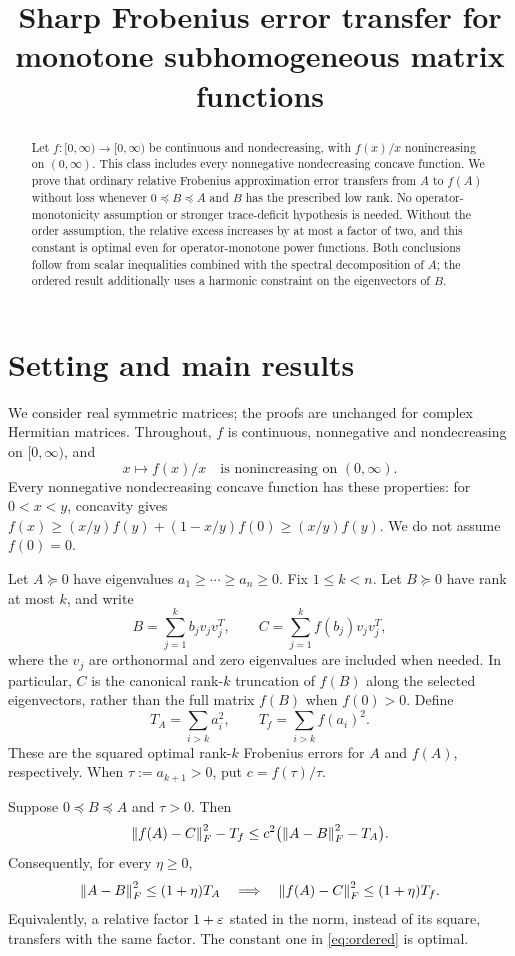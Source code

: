 \documentclass[11pt]{article}
\title{Sharp Frobenius error transfer for monotone subhomogeneous matrix functions}
\author{}
\date{}
\newcommand{\TA}{T_A}
\newcommand{\Tf}{T_f}
\begin{document}
\maketitle
\begin{abstract}
Let $f:[0,\infty)\to[0,\infty)$ be continuous and nondecreasing, with $f(x)/x$ nonincreasing on $(0,\infty)$. This class includes every nonnegative nondecreasing concave function. We prove that ordinary relative Frobenius approximation error transfers from $A$ to $f(A)$ without loss whenever $0\preceq B\preceq A$ and $B$ has the prescribed low rank. No operator-monotonicity assumption or stronger trace-deficit hypothesis is needed. Without the order assumption, the relative excess increases by at most a factor of two, and this constant is optimal even for operator-monotone power functions. Both conclusions follow from scalar inequalities combined with the spectral decomposition of $A$; the ordered result additionally uses a harmonic constraint on the eigenvectors of $B$.
\end{abstract}

\section{Setting and main results}
We consider real symmetric matrices; the proofs are unchanged for complex Hermitian matrices. Throughout, $f$ is continuous, nonnegative and nondecreasing on $[0,\infty)$, and
\begin{equation}\label{eq:subhom}
 x\longmapsto f(x)/x\quad\text{is nonincreasing on }(0,\infty).
\end{equation}
Every nonnegative nondecreasing concave function has these properties: for $0<x<y$, concavity gives $f(x)\ge (x/y)f(y)+(1-x/y)f(0)\ge(x/y)f(y)$. We do not assume $f(0)=0$.

Let $A\succeq0$ have eigenvalues $a_1\ge\cdots\ge a_n\ge0$. Fix $1\le k<n$. Let $B\succeq0$ have rank at most $k$, and write
\[
 B=\sum_{j=1}^k b_jv_jv_j^T,\qquad
 C=\sum_{j=1}^k f(b_j)v_jv_j^T,
\]
where the $v_j$ are orthonormal and zero eigenvalues are included when needed. In particular, $C$ is the canonical rank-$k$ truncation of $f(B)$ along the selected eigenvectors, rather than the full matrix $f(B)$ when $f(0)>0$. Define
\[
 \TA=\sum_{i>k}a_i^2,\qquad
 \Tf=\sum_{i>k}f(a_i)^2.
\]
These are the squared optimal rank-$k$ Frobenius errors for $A$ and $f(A)$, respectively. When $\tau:=a_{k+1}>0$, put $c=f(\tau)/\tau$.

\begin{theorem}\label{thm:ordered}
Suppose $0\preceq B\preceq A$ and $\tau>0$. Then
\begin{equation}\label{eq:ordered}
 \norm{f(A)-C}_F^2-\Tf
 \le c^2\bigl(\norm{A-B}_F^2-\TA\bigr).
\end{equation}
Consequently, for every $\eta\ge0$,
\[
 \norm{A-B}_F^2\le(1+\eta)\TA
 \quad\Longrightarrow\quad
 \norm{f(A)-C}_F^2\le(1+\eta)\Tf.
\]
Equivalently, a relative factor $1+\varepsilon$ stated in the norm, instead of its square, transfers with the same factor. The constant one in \eqref{eq:ordered} is optimal.
\end{theorem}
\end{document}
